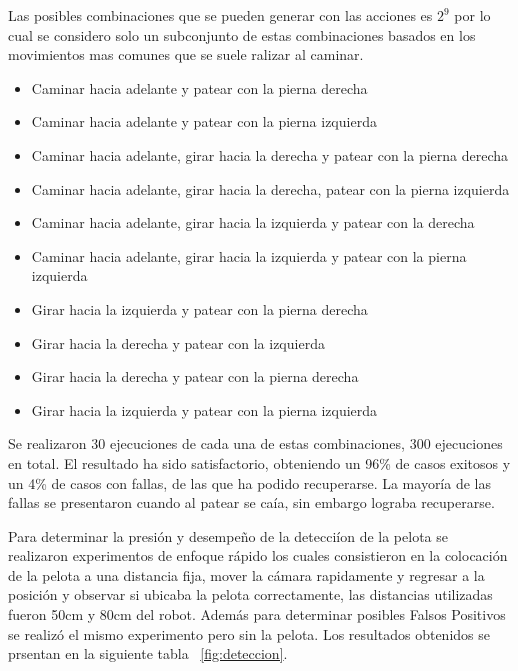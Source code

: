 Las posibles combinaciones que se pueden generar con las acciones es $2 ^ 9$ por lo cual se considero solo un subconjunto de estas combinaciones basados en los movimientos mas comunes que se suele ralizar al caminar.
\begin{itemize}


\setlength{\itemsep}{0.5pt}
\item Caminar hacia adelante y patear con la pierna derecha 
\item Caminar hacia adelante y patear con la pierna izquierda
\item Caminar hacia adelante, girar hacia la derecha y patear con la pierna derecha
\item Caminar hacia adelante, girar hacia la derecha, patear con la pierna izquierda 
\item Caminar hacia adelante, girar hacia la izquierda y patear con la derecha
\item Caminar hacia adelante, girar hacia la  izquierda y  patear con la pierna izquierda
\item Girar hacia la izquierda y patear con la pierna derecha
\item Girar hacia la derecha y patear con la izquierda
\item Girar hacia la derecha y patear con la pierna derecha
\item Girar hacia la izquierda y patear con la pierna izquierda
 \end{itemize}

Se realizaron 30 ejecuciones de cada una de estas combinaciones, 300 ejecuciones en total. El resultado ha sido satisfactorio, obteniendo un 96\% de casos exitosos y un 4\% de casos con fallas, de las que ha podido recuperarse. La mayoría de las fallas se presentaron cuando al patear se caía, sin embargo lograba recuperarse.  

Para determinar la presi\'on y desempe\~no de la detecci\'ion de la pelota se realizaron experimentos de enfoque r\'apido los cuales consistieron en la colocaci\'on de la pelota a una distancia fija, mover la c\'amara rapidamente y regresar a la posici\'on y observar si ubicaba la pelota correctamente, las distancias utilizadas fueron 50cm y 80cm del robot. Adem\'as para determinar posibles Falsos Positivos se realiz\'o el mismo experimento pero sin la pelota. Los resultados obtenidos se prsentan en la siguiente tabla ~\ref{fig:deteccion}.

